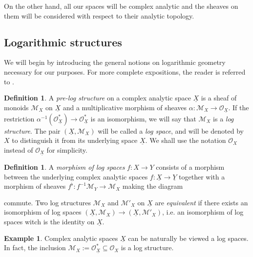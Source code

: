 \documentclass[reqno]{amsart}
\newcommand{\OO}{\mathcal{O}}
\newcommand{\M}{\mathcal{M}}
\theoremstyle{definition}
\newtheorem{definition}[theorem]{Definition}
\newtheorem{example}[theorem]{Example}
\theoremstyle{named}
\begin{document}
On the other hand, all our spaces will be complex analytic and the sheaves on them will be considered with respect to their analytic topology.




\subsection{Logarithmic structures}
We will begin by introducing the general notions on logarithmic geometry necessary for our purposes. For more complete expositions, the reader is referred to \cite{kato1988logarithmic_str, kato1996dlog_def, abramovich2010logarithmic}.

\begin{definition} \label{def:logscheme}
A \textit{pre-log structure} on a complex analytic space $\underline{X}$ is a sheaf of monoids $\M_X$ on $\underline{X}$ and a multiplicative morphism of sheaves $\alpha: \M_X\rightarrow \OO_{\underline{X}}$. If the restriction $\alpha^{-1}(\OO^\ast_{\underline{X}}) \rightarrow\OO^\ast_{\underline{X}}$ is an isomorphism, we will say that $\M_X$ is a \textit{log structure}. The pair $(\underline{X},\M_X)$ will be called a \textit{log space}, and will be denoted by $X$ to distinguish it from its underlying space $\underline{X}$. We shall use the notation $\OO_X$ instead of $\OO_{\underline{X}}$ for simplicity.
\end{definition}

\begin{definition}\label{def:morphism}
    A \emph{morphism of log spaces} $f:X\rightarrow Y$ consists of a morphism between the underlying complex analytic spaces $f: \underline{X}\rightarrow \underline{Y}$ together with a morphism of sheaves $f^\flat: f^{-1} \M_Y\rightarrow \M_X$ making the diagram
\begin{center}
\end{center}
commute. Two log structures $\M_X$ and $\M'_X$ on $\underline{X}$ are \textit{equivalent} if there exists an isomorphism of log spaces $(\underline{X},\M_X)\to (\underline{X},\M'_X)$, i.e. an isomorphism of log spaces witch is the identity on $\underline{X}$.
\end{definition}

\begin{example}
Complex analytic spaces $\underline{X}$ can be naturally be viewed a log spaces. In fact, the inclusion $\M_{X} :=\OO_{\underline{X}}^\ast\subseteq \OO_{X}$ is a log structure.
\end{example}
\end{document}
